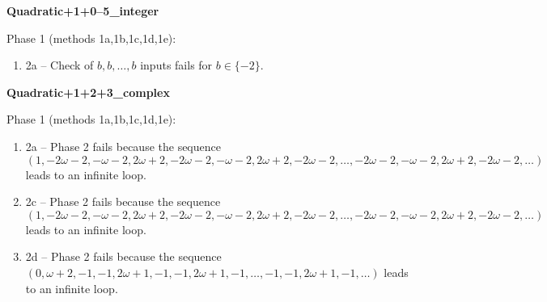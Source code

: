 \begin{exmp}
\label{ex:compareAK}

\textbf{Quadratic+1+0--5\_integer}

Phase 1 (methods 1a,\allowbreak  1b,\allowbreak  1c,\allowbreak  1d,\allowbreak  1e):
\begin{enumerate}[ ]
\item  2a -- Check of $b,\allowbreak b,\allowbreak \dots,\allowbreak b$ inputs fails for $b\in \{-2\}$.
\end{enumerate}


\end{exmp}




\begin{exmp}
\label{ex:compareAL}

\textbf{Quadratic+1+2+3\_complex}

Phase 1 (methods 1a,\allowbreak  1b,\allowbreak  1c,\allowbreak  1d,\allowbreak  1e):
\begin{enumerate}[ ]
\item  2a -- Phase 2   fails because  the sequence $(1,\allowbreak  -2\omega - 2,\allowbreak  -\omega - 2,\allowbreak  2\omega + 2,\allowbreak  -2\omega - 2,\allowbreak  -\omega - 2,\allowbreak  2\omega + 2,\allowbreak  -2\omega - 2,\allowbreak  \dots ,\allowbreak -2\omega - 2,\allowbreak  -\omega - 2,\allowbreak  2\omega + 2,\allowbreak  -2\omega - 2,\allowbreak  \dots)$ leads to an infinite loop.
\item  2c -- Phase 2   fails because  the sequence $(1,\allowbreak  -2\omega - 2,\allowbreak  -\omega - 2,\allowbreak  2\omega + 2,\allowbreak  -2\omega - 2,\allowbreak  -\omega - 2,\allowbreak  2\omega + 2,\allowbreak  -2\omega - 2,\allowbreak  \dots ,\allowbreak -2\omega - 2,\allowbreak  -\omega - 2,\allowbreak  2\omega + 2,\allowbreak  -2\omega - 2,\allowbreak  \dots)$ leads to an infinite loop.
\item  2d -- Phase 2   fails because  the sequence $(0,\allowbreak  \omega + 2,\allowbreak  -1,\allowbreak  -1,\allowbreak  2\omega + 1,\allowbreak  -1,\allowbreak  -1,\allowbreak  2\omega + 1,\allowbreak  -1,\allowbreak  \dots ,\allowbreak -1,\allowbreak  -1,\allowbreak  2\omega + 1,\allowbreak  -1,\allowbreak  \dots)$ leads to an infinite loop.
\end{enumerate}


\end{exmp}




